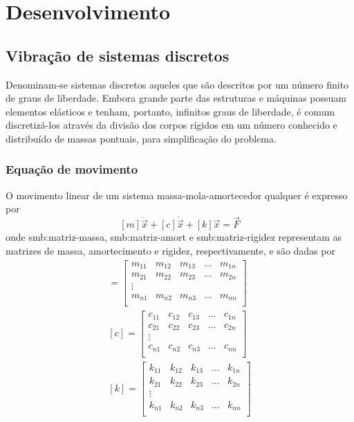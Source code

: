\documentclass[12pt,openright,oneside,a4paper,
	chapter=TITLE,section=TITLE,
	english,brazil]{abntex2}
\begin{document}
	\chapter{Desenvolvimento}
	
	\section{Vibração de sistemas discretos}
	Denominam-se sistemas discretos aqueles que são descritos por um número finito de graus de liberdade. Embora grande parte das estruturas e máquinas possuam elementos elásticos e tenham, portanto, infinitos graus de liberdade, é comum discretizá-los através da divisão dos corpos rígidos em um número conhecido e distribuído de massas pontuais, para simplificação do problema. 
	
	\subsection{Equação de movimento}
	O movimento linear de um sistema massa-mola-amortecedor qualquer é expresso por \cite{rao:2008}
	\begin{equation} \label{eqn:discr:movimento}
		[m]\ddot{\vec{x}} + [c]\dot{\vec{x}} + [k]\vec{x} = \vec{F}
	\end{equation}
	onde \gls{smb:matriz-massa}, \gls{smb:matriz-amort} e \gls{smb:matriz-rigidez} representam as matrizes de massa, amortecimento e rigidez, respectivamente, e são dadas por
	\begin{gather} 
		[m] = 
		\begin{bmatrix} \label{eqn:matr:massa}
			m_{11} & m_{12} & m_{13} & \dots & m_{1n}\\
			m_{21} & m_{22} & m_{23} & \dots & m_{2n}\\
			\vdots\\
			m_{n1} & m_{n2} & m_{n3} & \dots & m_{nn}\\
		\end{bmatrix}\\
		[c] = 
		\begin{bmatrix} \label{eqn:matr:amort}
			c_{11} & c_{12} & c_{13} & \dots & c_{1n}\\
			c_{21} & c_{22} & c_{23} & \dots & c_{2n}\\
			\vdots\\
			c_{n1} & c_{n2} & c_{n3} & \dots & c_{nn}\\
		\end{bmatrix}\\
		[k] =
		\begin{bmatrix} \label{eqn:matr:rigid}
			k_{11} & k_{12} & k_{13} & \dots & k_{1n}\\
			k_{21} & k_{22} & k_{23} & \dots & k_{2n}\\
			\vdots\\
			k_{n1} & k_{n2} & k_{n3} & \dots & k_{nn}\\
		\end{bmatrix}
	\end{gather}
\end{document}
